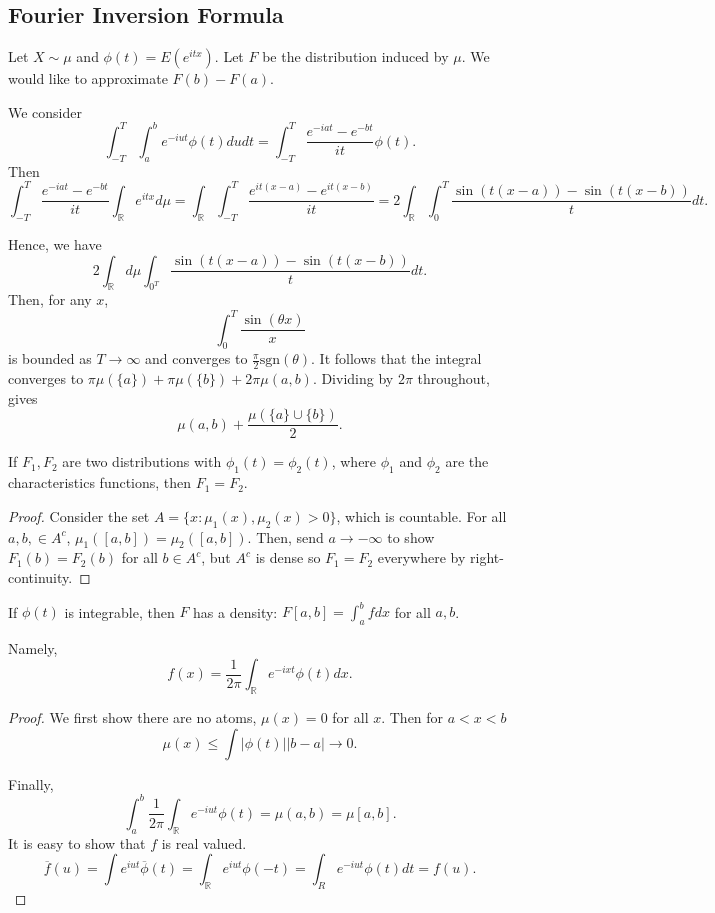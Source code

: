 \documentclass[11pt]{scrartcl}
\newcommand{\R}{\mathbb{R}}
\begin{document}
\subsection{Fourier Inversion Formula}
Let $X \sim \mu$ and $\phi(t) = E(e^{itx})$.  Let $F$ be the distribution induced by $\mu$.  We would like to approximate $F(b) - F(a)$.  

We consider $$\int_{-T}^T\int_{a}^b e^{-iut}\phi(t) du dt = \int_{-T}^T \frac{e^{-iat} - e^{-bt}}{it} \phi(t).$$
Then $$\int_{-T}^T \frac{e^{-iat} - e^{-bt}}{it} \int_\R e^{itx} d\mu= \int_\R \int_{-T}^T \frac{e^{it(x-a)} - e^{it(x-b)}}{it} = 2\int_\R \int_{0}^T \frac{\sin(t(x-a)) - \sin(t(x-b))}{t}dt.$$

Hence, we have 
$$2 \int_{\R}d\mu \int_{0^T} \frac{\sin(t(x-a)) - \sin(t(x-b))}{t}dt.$$
Then, for any $x$, $$\int_{0}^T \frac{\sin (\theta x)}{x} $$ is bounded as $T \rightarrow \infty$ and converges to $\frac{\pi}{2}\text{sgn}(\theta)$. 
It follows that the integral converges to $\pi \mu(\{a\}) + \pi\mu(\{b\}) + 2\pi \mu(a, b)$.  Dividing by $2\pi$ throughout, gives $$\mu(a,b) + \frac{\mu(\{a\} \cup \{b\})}{2}.$$
\begin{lemma} If $F_1, F_2$ are two distributions with $\phi_1(t) = \phi_2(t)$, where $\phi_1$ and $\phi_2$ are the characteristics functions, then $F_1 = F_2$.
\end{lemma}
\begin{proof}
Consider the set $A = \{x : \mu_1(x), \mu_2(x) > 0\}$, which is countable. For all $a, b, \in A^c$, $\mu_1([a, b]) = \mu_2([a, b])$.  Then, send $a \to -\infty$ to show $F_1(b) = F_2(b)$ for all $b \in A^c$, but $A^c$ is dense so $F_1 = F_2$ everywhere by right-continuity.
\end{proof}
\begin{thm}
If $\phi(t)$ is integrable, then $F$ has a density: $F[a, b] = \int_{a}^b f dx$ for all $a, b$.

Namely, $$f(x) = \frac{1}{2\pi}\int_\R e^{-ixt}\phi(t)dx.$$
\end{thm}
\begin{proof}
We first show there are no atoms, $\mu(x) = 0$ for all $x$.   Then for $a < x < b$
$$\mu(x) \le \int |\phi(t)| |b-a| \rightarrow 0.$$

Finally, $$\int_{a}^b\frac{1}{2\pi}\int_\R e^{-iut}\phi(t) = \mu(a, b) = \mu[a, b].$$
It is easy to show that $f$ is real valued. 
$$\overline{f}(u) = \int e^{iut}\overline{\phi}(t) = \int_{\R} e^{iut}\phi(-t) = \int_R e^{-iut}\phi(t)dt = f(u).$$
\end{proof}
\end{document}
